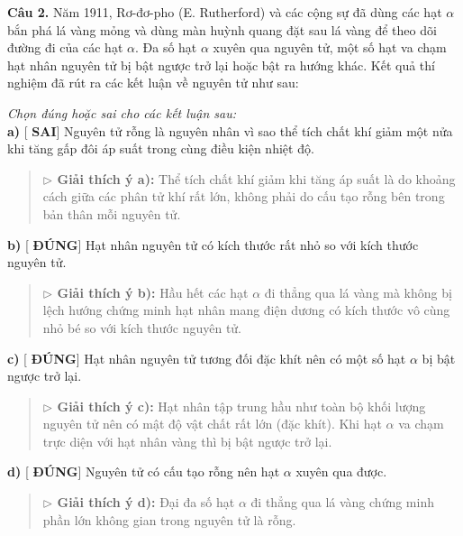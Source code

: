 \documentclass[11pt,a4paper]{article}
\begin{document}
\textbf{Câu 2.} Năm 1911, Rơ-đơ-pho (E. Rutherford) và các cộng sự đã dùng các hạt $\alpha$ bắn phá lá vàng mỏng và dùng màn huỳnh quang đặt sau lá vàng để theo dõi đường đi của các hạt $\alpha$. Đa số hạt $\alpha$ xuyên qua nguyên tử, một số hạt va chạm hạt nhân nguyên tử bị bật ngược trở lại hoặc bật ra hướng khác. Kết quả thí nghiệm đã rút ra các kết luận về nguyên tử như sau:

\textit{Chọn đúng hoặc sai cho các kết luận sau:}\\
\textbf{a)} [\textbf{\color{mySub} SAI}] Nguyên tử rỗng là nguyên nhân vì sao thể tích chất khí giảm một nửa khi tăng gấp đôi áp suất trong cùng điều kiện nhiệt độ.\\
\begin{quote}\small
{\color{myBlue}\textbf{$\triangleright$ Giải thích ý a):}} Thể tích chất khí giảm khi tăng áp suất là do khoảng cách giữa các phân tử khí rất lớn, không phải do cấu tạo rỗng bên trong bản thân mỗi nguyên tử.
\end{quote}

\textbf{b)} [\textbf{\color{red} ĐÚNG}] Hạt nhân nguyên tử có kích thước rất nhỏ so với kích thước nguyên tử.\\
\begin{quote}\small
{\color{myBlue}\textbf{$\triangleright$ Giải thích ý b):}} Hầu hết các hạt $\alpha$ đi thẳng qua lá vàng mà không bị lệch hướng chứng minh hạt nhân mang điện dương có kích thước vô cùng nhỏ bé so với kích thước nguyên tử.
\end{quote}

\textbf{c)} [\textbf{\color{red} ĐÚNG}] Hạt nhân nguyên tử tương đối đặc khít nên có một số hạt $\alpha$ bị bật ngược trở lại.\\
\begin{quote}\small
{\color{myBlue}\textbf{$\triangleright$ Giải thích ý c):}} Hạt nhân tập trung hầu như toàn bộ khối lượng nguyên tử nên có mật độ vật chất rất lớn (đặc khít). Khi hạt $\alpha$ va chạm trực diện với hạt nhân vàng thì bị bật ngược trở lại.
\end{quote}

\textbf{d)} [\textbf{\color{red} ĐÚNG}] Nguyên tử có cấu tạo rỗng nên hạt $\alpha$ xuyên qua được.\\
\begin{quote}\small
{\color{myBlue}\textbf{$\triangleright$ Giải thích ý d):}} Đại đa số hạt $\alpha$ đi thẳng qua lá vàng chứng minh phần lớn không gian trong nguyên tử là rỗng.
\end{quote}
\end{document}
